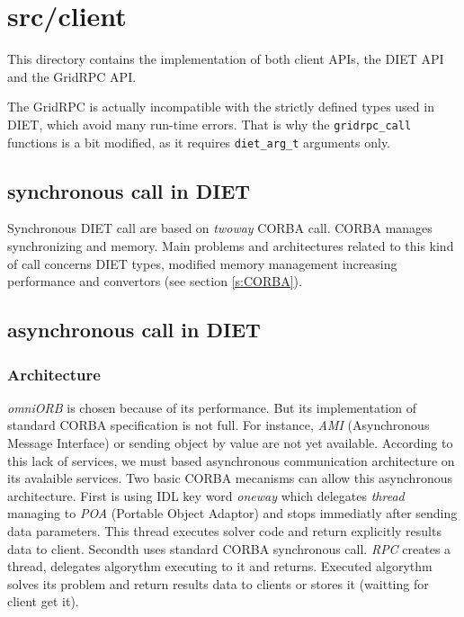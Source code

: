   \section{\textsf{src/client}}
  \label{s:client}

  This directory contains the implementation of both client APIs, the DIET API and
  the GridRPC API.

  The GridRPC is actually incompatible with the strictly defined types used in
  DIET, which avoid many run-time errors. That is why the \texttt{gridrpc\_call}
  functions is a bit modified, as it requires \texttt{diet\_arg\_t} arguments
  only.



  \subsection{synchronous call in DIET}
  Synchronous DIET call are based on \emph{twoway} CORBA call. CORBA manages synchronizing
  and memory. Main problems and architectures related to this kind of call concerns
  DIET types, modified memory management increasing performance and convertors (see section \ref{s:CORBA}).

  \subsection{asynchronous call in DIET}

  \subsubsection{Architecture}

  \emph{omniORB} is chosen because of its performance. But its implementation
  of standard CORBA specification is not full. For instance, \emph{AMI}
  (Asynchronous Message Interface) or sending object by value are not yet
  available. According to this lack of services, we must based asynchronous
  communication architecture on its avalaible services.
  Two basic CORBA mecanisms can allow this asynchronous architecture.
  First is using IDL key word \emph{oneway} which delegates \emph{thread} managing
  to \emph{POA} (Portable Object Adaptor) and stops immediatly after sending data parameters. This thread
  executes solver code and return explicitly results data to client.
  Secondth uses standard CORBA synchronous call.
  \emph{RPC} creates a thread, delegates algorythm executing to it and returns.
  Executed algorythm solves its problem and return results data to clients or stores
  it (waitting for client get it).

